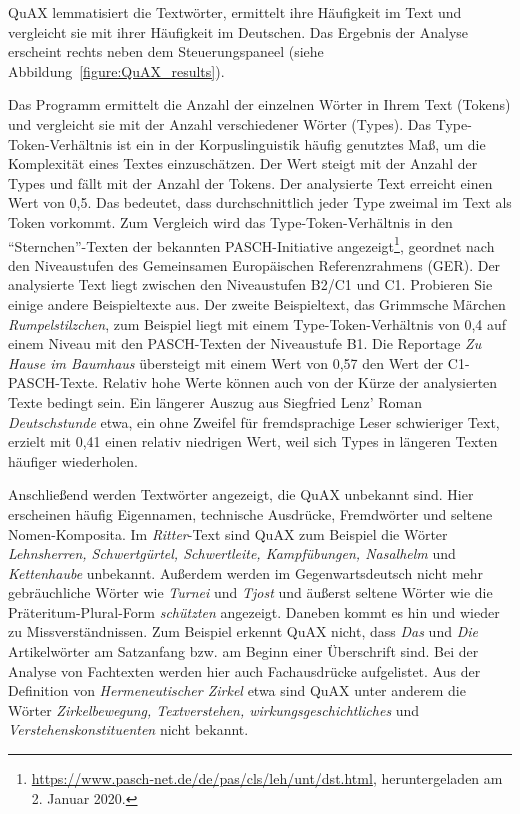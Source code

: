 \documentclass[11pt]{article}\usepackage[]{graphicx}\usepackage[]{color}
\begin{document}
QuAX lemmatisiert die Textwörter, ermittelt ihre Häufigkeit im Text und vergleicht sie mit ihrer Häufigkeit im Deutschen. Das Ergebnis der Analyse erscheint rechts neben dem Steuerungspaneel (siehe Abbildung~\ref{figure:QuAX_results}). 

Das Programm ermittelt die Anzahl der einzelnen Wörter in Ihrem Text (Tokens) und vergleicht sie mit der Anzahl verschiedener Wörter (Types). Das Type-Token-Verhältnis ist ein in der Korpuslinguistik häufig genutztes Maß, um die Komplexität eines Textes einzuschätzen. Der Wert steigt mit der Anzahl der Types und fällt mit der Anzahl der Tokens. Der analysierte Text erreicht einen Wert von 0,5. Das bedeutet, dass durchschnittlich jeder Type zweimal im Text als Token vorkommt. Zum Vergleich wird das Type-Token-Verhältnis in den "`Sternchen"'-Texten der bekannten PASCH-Initiative angezeigt\footnote{\url{https://www.pasch-net.de/de/pas/cls/leh/unt/dst.html}, heruntergeladen am 2. Januar 2020.}, geordnet nach den Niveaustufen des Gemeinsamen Europäischen Referenzrahmens (GER). Der analysierte Text liegt zwischen den Niveaustufen B2/C1 und C1. Probieren Sie einige andere Beispieltexte aus. Der zweite Beispieltext, das Grimmsche Märchen \textit{Rumpelstilzchen}, zum Beispiel liegt mit einem Type-Token-Verhältnis von 0,4 auf einem Niveau mit den PASCH-Texten der Niveaustufe B1. Die Reportage \textit{Zu Hause im Baumhaus} übersteigt mit einem Wert von 0,57 den Wert der C1-PASCH-Texte. Relativ hohe Werte können auch von der Kürze der analysierten Texte bedingt sein. Ein längerer Auszug aus Siegfried Lenz' Roman \textit{Deutschstunde} etwa, ein ohne Zweifel für fremdsprachige Leser schwieriger Text, erzielt mit 0,41 einen relativ niedrigen Wert, weil sich Types in längeren Texten häufiger wiederholen. 

Anschließend werden Textwörter angezeigt, die QuAX unbekannt sind. Hier erscheinen häufig Eigennamen, technische Ausdrücke, Fremdwörter und seltene Nomen-Komposita. Im \textit{Ritter}-Text sind QuAX zum Beispiel die Wörter \textit{Lehnsherren, Schwertgürtel, Schwertleite, Kampfübungen, Nasalhelm} und \textit{Kettenhaube} unbekannt. Außerdem werden im Gegenwartsdeutsch nicht mehr gebräuchliche Wörter wie \textit{Turnei} und \textit{Tjost} und äußerst seltene Wörter wie die Präteritum-Plural-Form \textit{schützten} angezeigt. Daneben kommt es hin und wieder zu Missverständnissen. Zum Beispiel erkennt QuAX nicht, dass \textit{Das} und \textit{Die} Artikelwörter am Satzanfang bzw. am Beginn einer Überschrift sind. Bei der Analyse von Fachtexten werden hier auch Fachausdrücke aufgelistet. Aus der Definition von \textit{Hermeneutischer Zirkel} etwa sind QuAX unter anderem die Wörter \textit{Zirkelbewegung, Textverstehen, wirkungsgeschichtliches} und \textit{Verstehenskonstituenten} nicht bekannt. 
\end{document}
